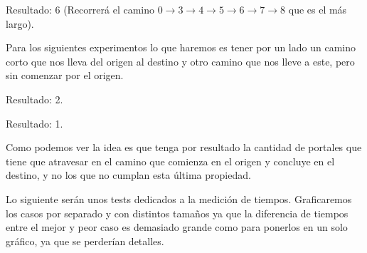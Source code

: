 Resultado: 6 (Recorrerá el camino $0\rightarrow3\rightarrow4\rightarrow5\rightarrow6\rightarrow7\rightarrow8$ que es el más largo).

Para los siguientes experimentos lo que haremos es tener por un lado un camino corto que nos lleva del origen al destino y otro camino que nos lleve a este, pero sin comenzar
por el origen.


Resultado: 2.


Resultado: 1.

Como podemos ver la idea es que tenga por resultado la cantidad de portales que tiene que atravesar en el camino que comienza en el origen y concluye en el destino, y no
los que no cumplan esta última propiedad.

Lo siguiente serán unos tests dedicados a la medición de tiempos. Graficaremos los casos por separado y con distintos tamaños ya que la diferencia de tiempos entre el mejor y peor caso es demasiado
grande como para ponerlos en un solo gráfico, ya que se perderían detalles.

